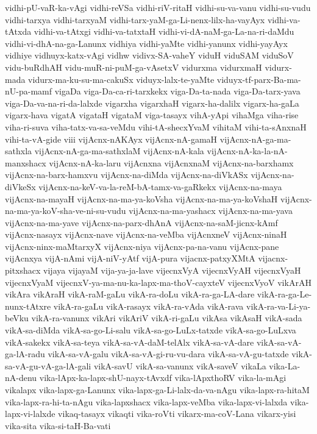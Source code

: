 {vidhi-pU-vaR-ka-vAgi
vidhi-reVSa
vidhi-riV-ritaH
vidhi-su-va-vanu
vidhi-su-vudu
vidhi-tarxya
vidhi-tarxyaM
vidhi-tarx-yaM-ga-Li-nenx-lilx-ha-vayAyx
vidhi-va-tAtxda
vidhi-va-tAtxgi
vidhi-va-tatxtaH
vidhi-vi-dA-naM-ga-La-na-ri-daMdu
vidhi-vi-dhA-na-ga-Lanunx
vidhiya
vidhi-yaMte
vidhi-yanunx
vidhi-yayAyx
vidhiye
vidhuyx-katx-vAgi
vidhw
vidivx-SA-vaheY
viduH
viduSAM
viduSoV
vidu-buRdhAH
vidu-muR-ni-puM-ga-vAsetxV
vidurxma
vidurxmaH
vidurx-mada
vidurx-ma-ku-su-ma-cakuSx
viduyx-lalx-te-yaMte
viduyx-tf-parx-Ba-ma-nU-pa-mamf
vigaDa
viga-Da-ca-ri-tarxkekx
viga-Da-ta-nada
viga-Da-tarx-yava
viga-Da-va-na-ri-da-lalxde
vigarxha
vigarxhaH
vigarx-ha-dalilx
vigarx-ha-gaLa
vigarx-hava
vigatA
vigataH
vigataM
viga-tasayx
vihA-yApi
vihaMga
viha-rise
viha-ri-suva
viha-tatx-va-sa-veMdu
vihi-tA-shecxYvaM
vihitaM
vihi-ta-sAnxnaH
vihi-ta-vA-gide
viii
vijAcnx-nAKAyx
vijAcnx-nA-gamaH
vijAcnx-nA-ga-ma-sathxla
vijAcnx-nA-ga-ma-sathxlaM
vijAcnx-nA-kala
vijAcnx-nA-ka-la-nA-manxshacx
vijAcnx-nA-ka-laru
vijAcnxna
vijAcnxnaM
vijAcnx-na-barxhamx
vijAcnx-na-barx-hamxvu
vijAcnx-na-diMda
vijAcnx-na-diVkASx
vijAcnx-na-diVkeSx
vijAcnx-na-keV-va-la-reM-bA-tamx-va-gaRkekx
vijAcnx-na-maya
vijAcnx-na-mayaH
vijAcnx-na-ma-ya-koVsha
vijAcnx-na-ma-ya-koVshaH
vijAcnx-na-ma-ya-koV-sha-ve-ni-su-vudu
vijAcnx-na-ma-yashacx
vijAcnx-na-ma-yava
vijAcnx-na-ma-yave
vijAcnx-na-parx-dhAnA
vijAcnx-na-saM-jicnx-kAmf
vijAcnx-nasayx
vijAcnx-nave
vijAcnx-na-veMba
vijAcnxneV
vijAcnx-ninaH
vijAcnx-ninx-maMtarxyX
vijAcnx-niya
vijAcnx-pa-na-vanu
vijAcnx-pane
vijAcnxya
vijA-nAmi
vijA-niV-yAtf
vijA-pura
vijacnx-patxyXMtA
vijacnx-pitxshacx
vijaya
vijayaM
vija-ya-ja-lave
vijecnxVyA
vijecnxVyAH
vijecnxVyaH
vijecnxVyaM
vijecnxV-ya-ma-nu-ka-lapx-ma-thoV-cayxteV
vijecnxVyoV
vikArAH
vikAra
vikAraH
vikA-raM-gaLu
vikA-ra-doLu
vikA-ra-ga-LA-dare
vikA-ra-ga-Le-nunx-tAtxre
vikA-ra-gaLu
vikA-rasayx
vikA-ra-vAda
vikA-rava
vikA-ra-va-Li-ya-beVku
vikA-ra-vanunx
vikAri
vikAriV
vikA-ri-gaLu
vikAsa
vikAsaH
vikA-sada
vikA-sa-diMda
vikA-sa-go-Li-salu
vikA-sa-go-LuLx-tatxde
vikA-sa-go-LuLxva
vikA-sakekx
vikA-sa-teya
vikA-sa-vA-daM-telAlx
vikA-sa-vA-dare
vikA-sa-vA-ga-lA-radu
vikA-sa-vA-galu
vikA-sa-vA-gi-ru-vu-dara
vikA-sa-vA-gu-tatxde
vikA-sa-vA-gu-vA-ga-lA-gali
vikA-savU
vikA-sa-vanunx
vikA-saveV
vikaLa
vika-La-nA-denu
vika-lApx-ka-lapx-shU-nayx-tAvxdf
vika-lApxthoRV
vika-la-mAgi
vikalapx
vika-lapx-ga-Lanunx
vika-lapx-ga-Li-lalx-da-va-nAgu
vika-lapx-ra-hitaM
vika-lapx-ra-hi-ta-nAgu
vika-lapxshacx
vika-lapx-veMba
vika-lapx-vi-lalxda
vika-lapx-vi-lalxde
vikaq-tasayx
vikaqti
vika-roVti
vikarx-ma-coV-Lana
vikarx-yisi
vika-sita
vika-si-taH-Ba-vati
}
